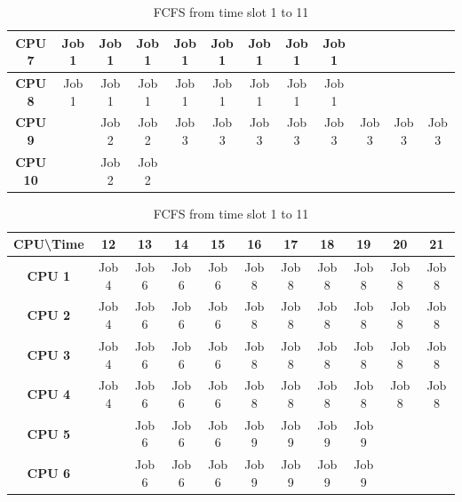 \documentclass[11pt]{article}
\begin{document}
\begin{table}[]
\begin{tabular}{|c|c|c|c|c|c|c|c|c|c|c|c|}
\textbf{CPU 7}                   & Job 1      & Job 1      & Job 1      & Job 1      & Job 1      & Job 1      & Job 1      & Job 1      &                &             &             \\ \hline
\textbf{CPU 8}                   & Job 1      & Job 1      & Job 1      & Job 1      & Job 1      & Job 1      & Job 1      & Job 1      &                &             &             \\ \hline
\textbf{CPU 9}                   &            & Job 2      & Job 2      & Job 3      & Job 3      & Job 3      & Job 3      & Job 3      & Job 3          & Job 3       & Job 3       \\ \hline
\textbf{CPU 10}                  &            & Job 2      & Job 2      &            &            &            &            &            &                &             &             \\ \hline
\end{tabular}
\caption{\label{FCFS1}FCFS from time slot 1 to 11}
\vspace{1cm}
\begin{tabular}{|c|c|c|c|c|c|c|c|c|c|c|}
\hline
\textbf{CPU\textbackslash{}Time} & \textbf{12} & \textbf{13} & \textbf{14} & \textbf{15} & \textbf{16} & \textbf{17} & \textbf{18} & \textbf{19} & \textbf{20} & \textbf{21} \\ \hline
\textbf{CPU 1}                   & Job 4       & Job 6       & Job 6       & Job 6       & Job 8       & Job 8       & Job 8       & Job 8       & Job 8       & Job 8       \\ \hline
\textbf{CPU 2}                   & Job 4       & Job 6       & Job 6       & Job 6       & Job 8       & Job 8       & Job 8       & Job 8       & Job 8       & Job 8       \\ \hline
\textbf{CPU 3}                   & Job 4       & Job 6       & Job 6       & Job 6       & Job 8       & Job 8       & Job 8       & Job 8       & Job 8       & Job 8       \\ \hline
\textbf{CPU 4}                   & Job 4       & Job 6       & Job 6       & Job 6       & Job 8       & Job 8       & Job 8       & Job 8       & Job 8       & Job 8       \\ \hline
\textbf{CPU 5}                   &             & Job 6       & Job 6       & Job 6       & Job 9       & Job 9       & Job 9       & Job 9       &             &             \\ \hline
\textbf{CPU 6}                   &             & Job 6       & Job 6       & Job 6       & Job 9       & Job 9       & Job 9       & Job 9       &             &             \\ \hline

\end{tabular}
\end{table}
\end{document}
